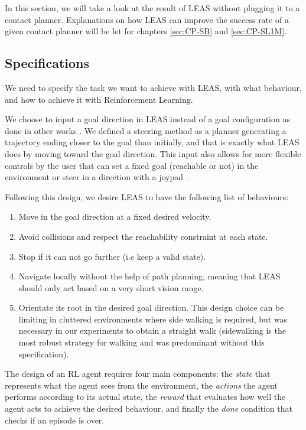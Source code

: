 In this section, we will take a look at the result of LEAS without plugging it to a contact planner.
Explanations on how LEAS can improve the success rate of a given contact planner will be let for chapters \ref{sec:CP-SB} and \ref{sec:CP-SL1M}.

\subsection{Specifications \label{subsubsec:specifications}}
We need to specify the task we want to achieve with LEAS, with what behaviour, and how to achieve it with Reinforcement Learning.

We choose to input a goal direction in LEAS instead of a goal configuration as done in other works \cite{kinodynamic-sm,DIMT,RL_RRT}.
We defined a steering method as a planner generating a trajectory ending closer to the goal than initially, and that is exactly what LEAS does by moving toward the goal direction.
This input also allows for more flexible controls by the user that can set a fixed goal (reachable or not) in the environment or steer in a direction with a joypad \cite{AcyclicCP}.

Following this design, we desire LEAS to have the following list of behaviours:
\begin{enumerate}[label=(\Alph*)]
  \item Move in the goal direction at a fixed desired velocity.
  \item Avoid collisions and respect the reachability constraint at each state. 
  \item Stop if it can not go further (i.e keep a valid state).
  \item Navigate locally without the help of path planning, meaning that LEAS should only act based on a very short vision range.
  \item Orientate its root in the desired goal direction. This design choice can be limiting in cluttered environments where side walking is required, but was necessary in our experiments to obtain a straight walk (sidewalking is the most robust strategy for walking and was predominant without this specification).
\label{list:leas:specifications}
\end{enumerate}

The design of an RL agent requires four main components: the \textit{state} that represents what the agent sees from the environment, the \textit{actions} the agent performs according to its actual state, the \textit{reward} that evaluates how well the agent acts to achieve the desired behaviour, and finally the \textit{done} condition that checks if an episode is over.

